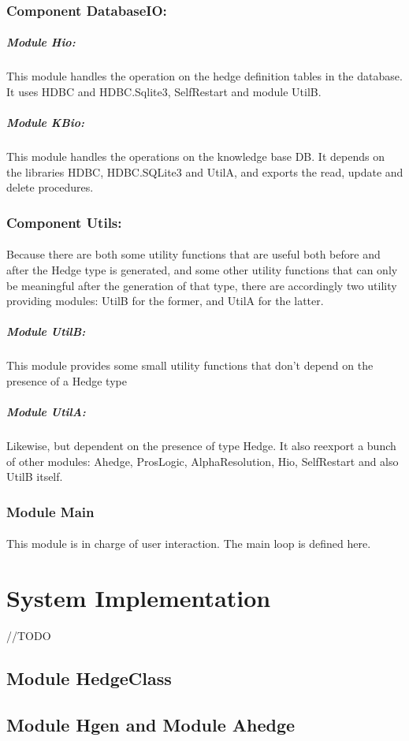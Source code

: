 \documentclass[../gr-final.tex]{subfiles}
\begin{document}
\subsubsection{Component DatabaseIO:}
\subparagraph{Module Hio:} This module handles the operation on the
hedge definition tables in the database. It uses HDBC and
HDBC.Sqlite3, SelfRestart and module UtilB.
\subparagraph{Module KBio:} This module handles the operations on the
knowledge base DB. It depends on the libraries HDBC, HDBC.SQLite3 and UtilA, and exports the read, update and delete procedures.
\subsubsection{Component Utils:}
\paragraph{} Because there are both some utility functions that are useful
both before and after the Hedge type is generated, and some other
utility functions that can only be meaningful after the generation of
that type, there are accordingly two utility providing modules: UtilB
for the former, and UtilA for the latter.
\subparagraph{Module UtilB:} This module provides some small utility
functions that don't depend on the presence of a Hedge type
\subparagraph{Module UtilA:} Likewise, but dependent on the presence of
type Hedge. It also reexport a bunch of other modules: Ahedge,
ProsLogic, AlphaResolution, Hio, SelfRestart and also UtilB itself.

\subsubsection{Module Main}

\paragraph{}This module is in charge of user interaction. The main
loop is defined here.
\section{System Implementation}

{\huge //TODO}
\subsection{Module HedgeClass}
\subsection{Module Hgen and Module Ahedge}
\end{document}
